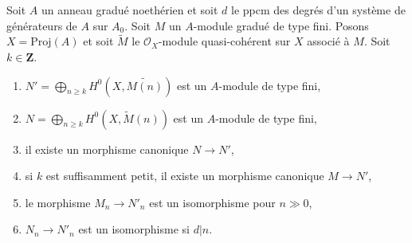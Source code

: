 \begin{lemma}
\label{lemma-recover-tail-graded-module-general}
Soit $A$ un anneau gradué noethérien et soit $d$ le ppcm des degrés d'un système de générateurs
de $A$ sur $A_0$. Soit $M$ un $A$-module gradué de
type fini. Posons $X = \text{Proj}(A)$ et soit $\widetilde{M}$
le $\mathcal{O}_X$-module quasi-cohérent sur $X$ associé à $M$.
Soit $k \in \mathbf{Z}$.
\begin{enumerate}
\item $N' = \bigoplus_{n \geq k} H^0(X, \widetilde{M(n)})$
est un $A$-module de type fini,
\item $N = \bigoplus_{n \geq k} H^0(X, \widetilde{M}(n))$
est un $A$-module de type fini,
\item il existe un morphisme canonique $N \to N'$,
\item si $k$ est suffisamment petit, il existe un morphisme canonique $M \to N'$,
\item le morphisme $M_n \to N'_n$ est un isomorphisme pour $n \gg 0$,
\item $N_n \to N'_n$ est un isomorphisme si $d | n$.
\end{enumerate}
\end{lemma}

